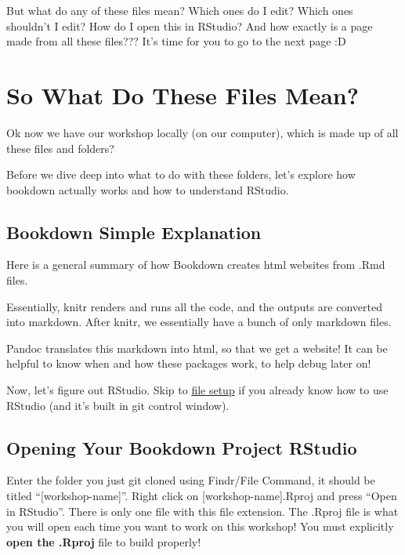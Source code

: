 \documentclass[
]{book}
\theoremstyle{definition}
\theoremstyle{definition}
\theoremstyle{definition}
\theoremstyle{definition}
\theoremstyle{remark}
\begin{document}
But what do any of these files mean? Which ones do I edit? Which ones shouldn't I edit? How do I open this in RStudio? And how exactly is a page made from all these files??? It's time for you to go to the next page :D

\chapter{So What Do These Files Mean?}\label{so-what-do-these-files-mean}

Ok now we have our workshop locally (on our computer), which is made up of all these files and folders?

Before we dive deep into what to do with these folders, let's explore how bookdown actually works and how to understand RStudio.

\section{Bookdown Simple Explanation}\label{bookdown-simple-explanation}

Here is a general summary of how Bookdown creates html websites from .Rmd files.

Essentially, knitr renders and runs all the code, and the outputs are converted into markdown. After knitr, we essentially have a bunch of only markdown files.

Pandoc translates this markdown into html, so that we get a website! It can be helpful to know when and how these packages work, to help debug later on!

Now, let's figure out RStudio. Skip to \hyperref[file-setup]{file setup} if you already know how to use RStudio (and it's built in git control window).

\section{Opening Your Bookdown Project RStudio}\label{opening-your-bookdown-project-rstudio}

Enter the folder you just git cloned using Findr/File Command, it should be titled ``{[}workshop-name{]}''. Right click on {[}workshop-name{]}.Rproj and press ``Open in RStudio''. There is only one file with this file extension. The .Rproj file is what you will open each time you want to work on this workshop! You must explicitly \textbf{open the .Rproj} file to build properly!
\end{document}
